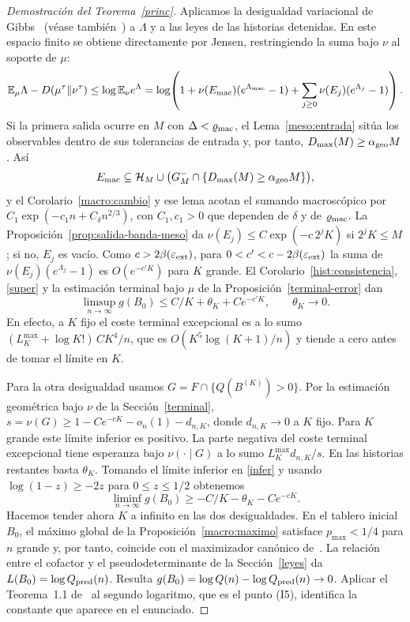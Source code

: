 \begin{proof}[Demostración del Teorema~\ref{princ}]
Aplicamos la desigualdad variacional de Gibbs~\cite[Proposición~1.4.2]{de} (véase
también~\cite[cap.~2]{ct}) a $\Lambda$ y a las leyes de
las historias detenidas. En este espacio finito se obtiene directamente por Jensen,
restringiendo la suma bajo $\nu$ al soporte de $\mu$:
\[
 \mathbb{E}_\mu\Lambda-D(\mu^\tau\Vert\nu^\tau)\le\log\mathbb{E}_\nu e^\Lambda
 =\log\!\left(1+\nu(E_{\rm mac})(e^{\Lambda_{\rm mac}}-1)
              +\sum_{j\ge0}\nu(E_j)(e^{\Lambda_j}-1)\right).
\]
Si la primera salida ocurre en $M$ con $\Delta<\varrho_{\rm mac}$, el Lema~\ref{meso:entrada} sitúa
los observables dentro de sus tolerancias de entrada y, por tanto, $D_{\max}(M)\ge\alpha_{\rm geo} M$. Así
\[
 E_{\rm mac}\subseteq\mathcal H_M\cup\bigl(G_M^-\cap\{D_{\max}(M)\ge\alpha_{\rm geo} M\}\bigr),
\]
y el Corolario~\ref{macro:cambio} y ese lema acotan el sumando macroscópico por
${C_1\exp(-c_1n+C_\delta n^{2/3})}$, con $C_1,c_1>0$ que dependen de $\delta$ y de $\varrho_{\rm mac}$.
La Proposición~\ref{prop:salida-banda-meso} da ${\nu(E_j)\le C\exp(-c\,2^jK)}$ si $2^jK\le M$; si no,
$E_j$ es vacío. Como
$c>2\beta(\varepsilon_{\rm ext})$, para $0<c'<c-2\beta(\varepsilon_{\rm ext})$ la suma de
$\nu(E_j)(e^{\Lambda_j}-1)$ es $O(e^{-c'K})$ para $K$ grande.
El Corolario~\ref{hist:consistencia}, \eqref{super} y la estimación terminal bajo $\mu$
de la Proposición~\ref{terminal-error} dan
\[
 \limsup_{n\to\infty}g(B_0)\le C/K+\theta_K+Ce^{-c'K},\qquad\theta_K\to0 .
\]
En efecto, a $K$ fijo el coste terminal excepcional es a lo sumo ${(L_K^{\max}+\log K!)\,CK^4/n}$,
que es ${O(K^5\log(K+1)/n)}$ y tiende a cero antes de tomar el límite en $K$.

Para la otra desigualdad usamos $G=F\cap\{Q(B^{(K)})>0\}$. Por la estimación geométrica bajo
$\nu$ de la Sección~\ref{terminal}, $s=\nu(G)\ge1-Ce^{-cK}-o_n(1)-d_{n,K}$, donde
$d_{n,K}\to0$ a $K$ fijo. Para $K$ grande este límite inferior es positivo. La parte
negativa del coste terminal excepcional tiene esperanza bajo $\nu(\cdot\mid G)$ a lo sumo
$L_K^{\max}d_{n,K}/s$. En las historias restantes basta $\theta_K$. Tomando el límite inferior en
\eqref{infer} y usando $\log(1-z)\ge-2z$ para $0\le z\le1/2$ obtenemos
\[
 \liminf_{n\to\infty}g(B_0)\ge-C/K-\theta_K-Ce^{-cK}.
\]
Hacemos tender ahora $K$ a infinito en las dos desigualdades. En el tablero inicial $B_0$, el
máximo global de la Proposición~\ref{macro:maximo} satisface $p_{\max}<1/4$ para $n$ grande y,
por tanto, coincide con el maximizador canónico de~\cite{pred}. La relación entre el cofactor y el
pseudodeterminante de la Sección~\ref{leyes} da $L(B_0)=\log Q_{\rm pred}(n)$. Resulta
$g(B_0)=\log Q(n)-\log Q_{\rm pred}(n)\to0$. Aplicar el Teorema~1.1 de~\cite{pred} al
segundo logaritmo, que es el punto (I5), identifica la constante que aparece en el enunciado.
\end{proof}
